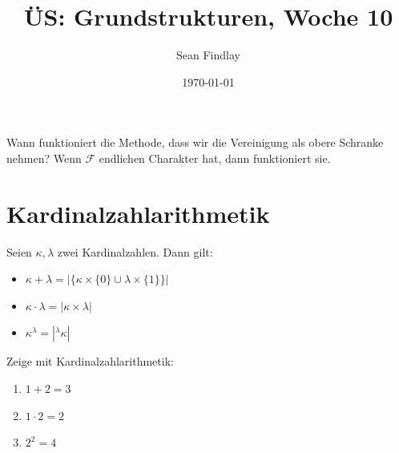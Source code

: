\documentclass[12pt]{article}
\title{ÜS: Grundstrukturen, Woche 10}
\author{Sean Findlay}
\date{\today}
\begin{document}
\maketitle

Wann funktioniert die Methode, dass wir die Vereinigung als obere Schranke nehmen? Wenn $\mathcal{F}$ endlichen Charakter hat, dann funktioniert sie.

\section{Kardinalzahlarithmetik}

\begin{definition}{}{}
    Seien $\kappa, \lambda$ zwei Kardinalzahlen. Dann gilt:
    \begin{itemize}
        \item $\kappa + \lambda = |\{\kappa \times \{0\} \cup \lambda \times \{1\}\}|$
        \item $\kappa \cdot \lambda = |\kappa \times \lambda|$
        \item $\kappa^\lambda = |{}^\lambda \kappa|$
    \end{itemize}
\end{definition}

\begin{exercise}{}{}
    Zeige mit Kardinalzahlarithmetik:
    \begin{enumerate}
        \item $1 + 2 = 3$
        \item $1 \cdot 2 = 2$
        \item $2^2 = 4$
    \end{enumerate}
\end{exercise}
\end{document}
